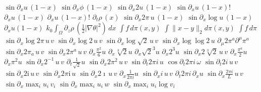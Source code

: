 \documentclass{article}
\begin{document}
$\sin\partial_x u\,(1-x)$ $\sin\partial_x\phi\,(1-x)$ $\sin\partial_x 2u\,(1-x)$ $\sin\partial_x u\,(1-x)!$ $\partial_x u\,(1-x)$
$\partial_x u\,(1-x)!$ $\partial_t\rho\,(x)$ $\sin\partial_x 2\pi\,u\,(1-x)$ $\sin\partial_x\log u\,(1-x)$ $\partial_x u(1-x)$
$k_{0}\int_{\Omega}\partial_{z}\rho\,(\tfrac{1}{2}|\nabla\theta|^{2})\,dx$
$\int f\,d\pi(x,y)$ $\int\|x-y\|_{2}d\pi(x,y)$ $\int f\,d\pi$
$\sin\partial_x\log 2\pi\,u\,v$ $\sin\partial_x\log 2\,u\,v$ $\sin\partial_x\log\sqrt2\,u\,v$ $\sin\partial_x\log\log 2\,u$
$\partial_\mu 2\pi^a\partial^\mu\pi^a$ $\sin\partial_x 2\pi_a\,u\,v$ $\sin\partial_x 2\pi^a\,u\,v$ $\partial_x\frac{\pi^2}{6}u$ $\partial_x\sqrt[3]{2}u$
$\partial_x\sqrt2^3u$ $\partial_x 2^3u$ $\sin\partial_x 2\sqrt[3]{2}\,u\,v$ $\partial_x\frac{\pi^a}{2}u$ $\partial_x\pi^2 u$ $\sin\partial_x 2^{-1}\,u\,v$
$\partial_t\frac{1}{\sqrt2}u$ $\sin\partial_x 2\pi^2\,u\,v$
$\sin\partial_t 2\pi i\,u$ $\cos\partial_t 2\pi i\,\omega$ $\sin\partial_t 2i\,u\,v$ $\sin\partial_x 2\mathrm{i}\,u\,v$ $\sin\partial_x 2\pi\mathrm{i}\,u$
$\sin\partial_x 2\imath\,u\,v$ $\partial_x\frac{1}{2\pi i}u$ $\sin\partial_x i\,u\,v$ $\partial_t 2\pi i\,\partial_x u$ $\sin\partial_x\frac{2\pi i}{L}\,u\,v$
$\sin\partial_x\max_i u_i\,v_i$ $\sin\partial_x\max_i u_i\,w$ $\sin\partial_x\max_i u_i\log v_i$
\end{document}

